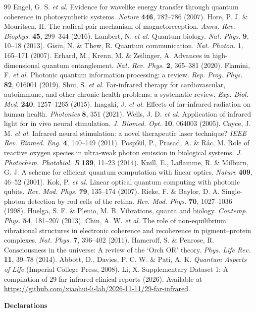 \documentclass[11pt,a4paper]{article}
\begin{document}
\begin{thebibliography}{99}
 Engel, G. S. \textit{et al.} Evidence for wavelike energy transfer through quantum coherence in photosynthetic systems. \textit{Nature} \textbf{446}, 782--786 (2007).
 Hore, P. J. \& Mouritsen, H. The radical-pair mechanism of magnetoreception. \textit{Annu. Rev. Biophys.} \textbf{45}, 299--344 (2016).
 Lambert, N. \textit{et al.} Quantum biology. \textit{Nat. Phys.} \textbf{9}, 10--18 (2013).
 Gisin, N. \& Thew, R. Quantum communication. \textit{Nat. Photon.} \textbf{1}, 165--171 (2007).
 Erhard, M., Krenn, M. \& Zeilinger, A. Advances in high-dimensional quantum entanglement. \textit{Nat. Rev. Phys.} \textbf{2}, 365--381 (2020).
 Flamini, F. \textit{et al.} Photonic quantum information processing: a review. \textit{Rep. Prog. Phys.} \textbf{82}, 016001 (2019).
 Shui, S. \textit{et al.} Far-infrared therapy for cardiovascular, autoimmune, and other chronic health problems: a systematic review. \textit{Exp. Biol. Med.} \textbf{240}, 1257--1265 (2015).
 Inagaki, J. \textit{et al.} Effects of far-infrared radiation on human health. \textit{Photonics} \textbf{8}, 351 (2021).
 Wells, J. D. \textit{et al.} Application of infrared light for in vivo neural stimulation. \textit{J. Biomed. Opt.} \textbf{10}, 064003 (2005).
 Cayce, J. M. \textit{et al.} Infrared neural stimulation: a novel therapeutic laser technique? \textit{IEEE Rev. Biomed. Eng.} \textbf{4}, 140--149 (2011).
 Posp\'{i}\v{s}il, P., Prasad, A. \& R\'{a}c, M. Role of reactive oxygen species in ultra-weak photon emission in biological systems. \textit{J. Photochem. Photobiol. B} \textbf{139}, 11--23 (2014).
 Knill, E., Laflamme, R. \& Milburn, G. J. A scheme for efficient quantum computation with linear optics. \textit{Nature} \textbf{409}, 46--52 (2001).
 Kok, P. \textit{et al.} Linear optical quantum computing with photonic qubits. \textit{Rev. Mod. Phys.} \textbf{79}, 135--174 (2007).
 Rieke, F. \& Baylor, D. A. Single-photon detection by rod cells of the retina. \textit{Rev. Mod. Phys.} \textbf{70}, 1027--1036 (1998).
 Huelga, S. F. \& Plenio, M. B. Vibrations, quanta and biology. \textit{Contemp. Phys.} \textbf{54}, 181--207 (2013).
 Chin, A. W. \textit{et al.} The role of non-equilibrium vibrational structures in electronic coherence and recoherence in pigment--protein complexes. \textit{Nat. Phys.} \textbf{7}, 396--402 (2011).
 Hameroff, S. \& Penrose, R. Consciousness in the universe: A review of the `Orch OR' theory. \textit{Phys. Life Rev.} \textbf{11}, 39--78 (2014).
 Abbott, D., Davies, P. C. W. \& Pati, A. K. \textit{Quantum Aspects of Life} (Imperial College Press, 2008).
 Li, X. Supplementary Dataset 1: A compilation of 29 far-infrared clinical reports (2026). Available at \url{https://github.com/xiaohui-li-lab/2026-11-11/29-far-infrared}.
\end{thebibliography}
\textbf{\textbf{Declarations}}
\end{document}
